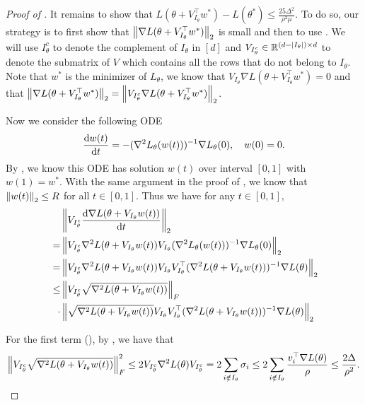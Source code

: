 \begin{proof}[Proof of ]
It remains to show that $L(\theta+ V_{I_\theta}^\top w^*)-L(\theta^*)\le \frac{25\Delta^2}{\rho^2\mu}$. To do so, our strategy is to first show that $\left\|\nabla L(\theta+V_{I_\theta}^\top w^*)\right\|_2$ is small and then to use . We will use $I_\theta^c$ to denote the complement of $I_\theta$ in $[d]$ and $V_{I_\theta^c}\in\mathbb{R}^{(d-|I_\theta|)\times d}$ to denote the submatrix of $V$ which contains all the rows that do not belong to $I_\theta$. Note that $w^*$ is the minimizer of $L_\theta$, we know that $V_{I_\theta} \nabla L(\theta+V_{I_\theta}^\top w^*) = 0$ and that $\left\|\nabla L(\theta+V_{I_\theta}^\top w^*)\right\|_2 = \left\|V_{I_\theta^c}\nabla L(\theta+V_{I_\theta}^\top w^*)\right\|_2$. 

Now we consider the following ODE 
	\begin{align}\label{eq:mirror_ode}
		\frac{\mathrm{d} w(t)}{\mathrm{d} t} = - (\nabla^2 L_\theta(w(t)))^{-1} \nabla L_\theta(0), \quad w(0)=0.
	\end{align}
By , we know this ODE has solution $w(t)$ over interval $[0,1]$ with $w(1) = w^*$. With the same argument in the proof of , we know that $\left\|w(t)\right\|_2\le R$ for all $t\in[0,1]$. Thus we have for any $t\in[0,1]$,
\begin{align}\label{eq:gradient_increasing_speed}
	&\left\|V_{I_\theta^c}\frac{\mathrm{d} \nabla L(\theta+ V_{I_\theta} w(t))}{\mathrm{d} t}\right\|_2 \\\
	= &\left\|V_{I_\theta^c}  \nabla^2 L(\theta+ V_{I_\theta} w(t))V_{I_\theta}(\nabla^2 L_\theta(w(t)))^{-1} \nabla L_\theta(0)\right\|_2 \\
	= &  \left\|V_{I_\theta^c}  \nabla^2 L(\theta+ V_{I_\theta} w(t))V_{I_\theta}V_{I_\theta}^\top(\nabla^2 L(\theta+ V_{I_\theta} w(t)))^{-1} \nabla L(\theta)\right\|_2\\
	\le & \left\|V_{I_\theta^c}  \sqrt{\nabla^2 L(\theta+ V_{I_\theta} w(t))}\right\|_F \label{eq:term1}\\
	\cdot & \left\|\sqrt{\nabla^2 L(\theta+ V_{I_\theta} w(t))}V_{I_\theta}V_{I_\theta}^\top(\nabla^2 L(\theta+ V_{I_\theta} w(t)))^{-1} \nabla L(\theta) \right\|_2\label{eq:term2}
	\end{align}
	
For the first term (), by , we have that 
\begin{align}
\left\|V_{I_\theta^c}  \sqrt{\nabla^2 L(\theta+ V_{I_\theta} w(t))}\right\|_F ^2 \le 2V_{I_\theta^c} \nabla^2 L(\theta) V_{I_\theta^c} = 2\sum_{i\notin I_\theta} \sigma_i \le 2\sum_{i\notin I_\theta} \frac{v_i^\top\nabla L(\theta)}{\rho}\le \frac{2\Delta}{\rho^2}.
\end{align}


\end{proof}
